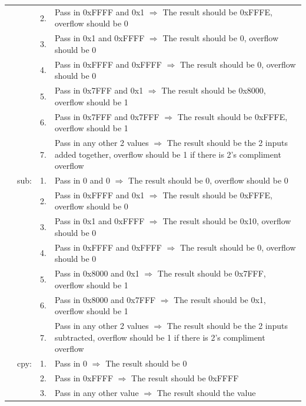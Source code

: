 \documentclass{article}
\begin{document}
\begin{longtable}{ r r r p{11cm} }
				                &      & 2. & Pass in 0xFFFF and 0x1 $\Rightarrow$ The result should be 0xFFFE, overflow should be 0\\
				                &      & 3. & Pass in 0x1 and 0xFFFF $\Rightarrow$ The result should be 0, overflow should be 0\\
				                &      & 4. & Pass in 0xFFFF and 0xFFFF $\Rightarrow$ The result should be 0, overflow should be 0\\
				                &      & 5. & Pass in 0x7FFF and 0x1 $\Rightarrow$ The result should be 0x8000, overflow should be 1\\
				                &      & 6. & Pass in 0x7FFF and 0x7FFF $\Rightarrow$ The result should be 0xFFFE, overflow should be 1\\
				                &      & 7. & Pass in any other 2 values $\Rightarrow$ The result should be the 2 inputs added together, overflow should be 1 if there is 2's compliment overflow\\
				                & sub: & 1. & Pass in 0 and 0 $\Rightarrow$ The result should be 0, overflow should be 0\\
				                &      & 2. & Pass in 0xFFFF and 0x1 $\Rightarrow$ The result should be 0xFFFE, overflow should be 0\\
				                &      & 3. & Pass in 0x1 and 0xFFFF $\Rightarrow$ The result should be 0x10, overflow should be 0\\
				                &      & 4. & Pass in 0xFFFF and 0xFFFF $\Rightarrow$ The result should be 0, overflow should be 0\\
				                &      & 5. & Pass in 0x8000 and 0x1 $\Rightarrow$ The result should be 0x7FFF, overflow should be 1\\
				                &      & 6. & Pass in 0x8000 and 0x7FFF $\Rightarrow$ The result should be 0x1, overflow should be 1\\
				                &      & 7. & Pass in any other 2 values $\Rightarrow$ The result should be the 2 inputs subtracted, overflow should be 1 if there is 2's compliment overflow\\
				                & cpy: & 1. & Pass in 0 $\Rightarrow$ The result should be 0\\
				                &      & 2. & Pass in 0xFFFF $\Rightarrow$ The result should be 0xFFFF\\
				                &      & 3. & Pass in any other value $\Rightarrow$ The result should the value\\
			\end{longtable}
\end{document}
